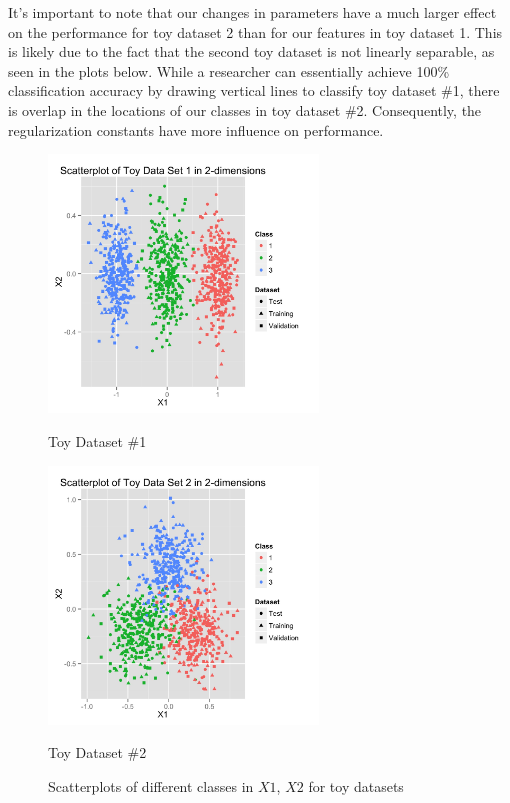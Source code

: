 \documentclass[10pt]{article}
\begin{document}
It's important to note that our changes in parameters have a much larger effect on the performance for toy dataset 2 than for our features in toy dataset 1. This is likely due to the fact that the second toy dataset is not linearly separable, as seen in the plots below. While a researcher can essentially achieve 100\% classification accuracy by drawing vertical lines to classify toy dataset \#1, there is overlap in the locations of our classes in toy dataset \#2. Consequently, the regularization constants have more influence on performance.

\begin{figure}[ht]
	\centering
	\begin{minipage}[b]{.48\linewidth}
		\includegraphics[width=1\linewidth, height=2.7in]{t1dist.jpg}
		\caption*{Toy Dataset \#1}
	\end{minipage}
	\begin{minipage}[b]{.48\linewidth}
		\includegraphics[width=1\linewidth, height=2.7in]{t2dist.jpg}
		\caption*{Toy Dataset \#2}
	\end{minipage}
	\caption{Scatterplots of different classes in $X1$, $X2$ for toy datasets}
\end{figure}
\end{document}
